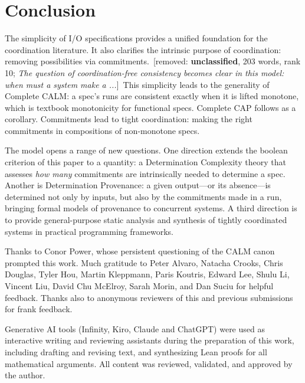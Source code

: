 \documentclass[sigconf]{cidr-2027}
\theoremstyle{remark}
\newcommand{\commitments}{commitments\xspace}
\newcommand{\Commitments}{Commitments\xspace}
\newcommand{\spectype}[1][]{I/O specification#1\xspace}
\newcommand{\removednote}[1]{{\color{cutred}\footnotesize\,[removed: #1]\,}}
\begin{document}
\section{Conclusion}
\label{sec:conclusion}

\textcolor{newblue}{The simplicity of \spectype[s] provides a unified foundation for the
coordination literature.} It also clarifies the intrinsic purpose of
coordination: removing possibilities via \commitments. \removednote{\textbf{unclassified}, 203 words, rank 10; \textit{The question of coordination-free consistency becomes clear in this model: when must a system make a ...}} \textcolor{newblue}{This simplicity
leads to the generality of Complete CALM: a spec's runs are consistent exactly
when it is lifted monotone, which is textbook monotonicity for
functional specs.} \textcolor{newblue}{Complete CAP follows as a corollary.} \textcolor{newblue}{\Commitments
lead to tight coordination: making the right commitments in compositions of non-monotone specs.}







\textcolor{newblue}{The model opens a range of new questions.} One direction
extends the boolean criterion of this paper to a quantity: a Determination
Complexity theory that assesses \emph{how many} \commitments are intrinsically
needed to determine a spec. \textcolor{newblue}{Another is Determination Provenance: a
given output---or its absence---is determined not only by inputs, but also by
the \commitments made in a run, bringing formal models of provenance to
concurrent systems.} A third direction is to provide general-purpose static
analysis and synthesis of tightly coordinated systems in practical programming frameworks.

\begin{acks}
\textcolor{newblue}{Thanks to Conor Power, whose persistent questioning of the CALM canon prompted this work.} \textcolor{newblue}{Much gratitude to Peter Alvaro, Natacha Crooks, Chris Douglas, Tyler Hou, Martin
Kleppmann, Paris Koutris, Edward Lee, Shulu Li, Vincent Liu, David Chu McElroy,
Sarah Morin, and Dan Suciu for helpful feedback.} \textcolor{newblue}{Thanks also to
anonymous reviewers of this and previous submissions for frank feedback.}

\textcolor{newblue}{Generative AI tools (Infinity, Kiro, Claude and ChatGPT) were used as interactive writing and
reviewing assistants during the preparation of this work, including drafting
and revising text, and synthesizing Lean proofs for all mathematical arguments.} \textcolor{newblue}{All
content was reviewed, validated, and approved by the author.}
\end{acks}




\end{document}
